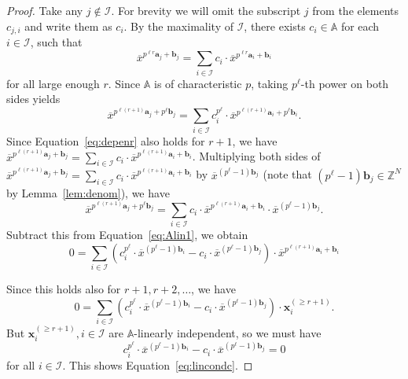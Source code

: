 \documentclass[letterpaper, 11pt, thm-restate]{article}
\numberwithin{equation}{section}
\newcommand{\Z}{\mathbb{Z}}
\newcommand{\A}{\mathbb{A}}
\newcommand{\mI}{\mathcal{I}}
\newcommand{\ba}{\boldsymbol{a}}
\newcommand{\bb}{\boldsymbol{b}}
\newcommand{\bx}{\boldsymbol{x}}
\newcommand{\ox}{\overline{x}}
\theoremstyle{definition}
\theoremstyle{definition}
\theoremstyle{definition}
\begin{document}
\begin{proof}
    Take any $j \notin \mI$. For brevity we will omit the subscript $j$ from the elements $c_{j,i}$ and write them as $c_i$.
    By the maximality of $\mI$, there exists $c_i \in \A$ for each $i \in \mI$, such that 
    \begin{equation}\label{eq:depenr}
        \ox^{p^{\ell r} \ba_j + \bb_j} = \sum_{i \in \mI} c_i \cdot \ox^{p^{\ell r} \ba_i + \bb_i}
    \end{equation}
    for all large enough $r$.
    Since $\A$ is of characteristic $p$, taking $p^{\ell}$-th power on both sides yields
    \begin{equation}\label{eq:Alin1}
    \ox^{p^{\ell (r+1)} \ba_j + p^{\ell} \bb_j} = \sum_{i \in \mI} c_i^{p^{\ell}} \cdot \ox^{p^{\ell (r+1)} \ba_i + p^{\ell} \bb_i}.
    \end{equation}
    Since Equation~\eqref{eq:depenr} also holds for $r+1$, we have $\ox^{p^{\ell (r+1)} \ba_j + \bb_j} = \sum_{i \in \mI} c_i \cdot \ox^{p^{\ell (r+1)} \ba_i + \bb_i}$.
    Multiplying both sides of $\ox^{p^{\ell (r+1)} \ba_j + \bb_j} = \sum_{i \in \mI} c_i \cdot \ox^{p^{\ell (r+1)} \ba_i + \bb_i}$ by $\ox^{(p^{\ell}-1)\bb_j}$ (note that $(p^{\ell}-1)\bb_j \in \Z^N$ by Lemma~\ref{lem:denom}), we have
    \begin{equation*}
    \ox^{p^{\ell (r+1)} \ba_j + p^{\ell} \bb_j} = \sum_{i \in \mI} c_i \cdot \ox^{p^{\ell (r+1)} \ba_i + \bb_i} \cdot \ox^{(p^{\ell}-1)\bb_j}.
    \end{equation*}
    Subtract this from Equation~\eqref{eq:Alin1}, we obtain
    \[
    0 = \sum_{i \in \mI} \left( c_i^{p^{\ell}} \cdot \ox^{(p^{\ell} - 1) \bb_i} - c_i \cdot \ox^{(p^{\ell}-1)\bb_j}\right) \cdot \ox^{p^{\ell (r+1)} \ba_i + \bb_i}
    \]
    
    Since this holds also for $r+1, r+2, \ldots$, we have
    \[
    0 = \sum_{i \in \mI} \left( c_i^{p^{\ell}} \cdot \ox^{(p^{\ell} - 1) \bb_i} - c_i \cdot \ox^{(p^{\ell}-1)\bb_j}\right) \cdot \bx_i^{(\geq r + 1)}.
    \]
    But $\bx_i^{(\geq r+1)}, i \in \mI$ are $\A$-linearly independent, so we must have 
    \[
    c_i^{p^{\ell}} \cdot \ox^{(p^{\ell} - 1) \bb_i} - c_i \cdot \ox^{(p^{\ell}-1)\bb_j} = 0
    \]
    for all $i \in \mI$. This shows Equation~\eqref{eq:lincondc}.
    

\end{proof}
\end{document}
